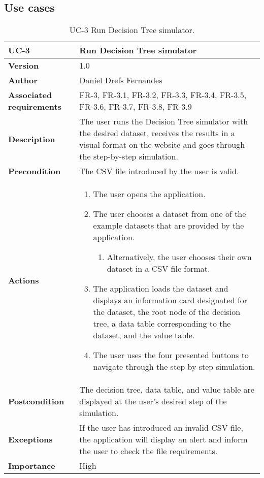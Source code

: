 \subsection{Use cases}
\begin{table}[p]
	\centering
	\begin{tabularx}{\linewidth}{ p{} p{} }
		\toprule
		\textbf{UC-3}    & \textbf{Run Decision Tree simulator}\\
		\toprule
		\textbf{Version}              & 1.0    \\
		\textbf{Author}                & Daniel Drefs Fernandes \\
		\textbf{Associated requirements} & FR-3, FR-3.1, FR-3.2, FR-3.3, FR-3.4, FR-3.5, FR-3.6, FR-3.7, FR-3.8, FR-3.9 \\
		\textbf{Description}          & The user runs the Decision Tree simulator with the desired dataset, receives the results in a visual format on the website and goes through the step-by-step simulation. \\
		\textbf{Precondition}         & The CSV file introduced by the user is valid. \\
		\textbf{Actions}             &
		\begin{enumerate}
			\def\labelenumi{\arabic{enumi}.}
			\tightlist
			\item The user opens the application.
			\item The user chooses a dataset from one of the example datasets that are provided by the application.
            \begin{enumerate}
                \item Alternatively, the user chooses their own dataset in a CSV file format.
            \end{enumerate}
            \item The application loads the dataset and displays an information card designated for the dataset, the root node of the decision tree, a data table corresponding to the dataset, and the value table.
            \item The user uses the four presented buttons to navigate through the step-by-step simulation.
		\end{enumerate}\\
		\textbf{Postcondition}        & The decision tree, data table, and value table are displayed at the user's desired step of the simulation. \\
		\textbf{Exceptions}          & If the user has introduced an invalid CSV file, the application will display an alert and inform the user to check the file requirements. \\
		\textbf{Importance}          & High \\
		\bottomrule
	\end{tabularx}
	\caption{UC-3 Run Decision Tree simulator.}
\end{table}

